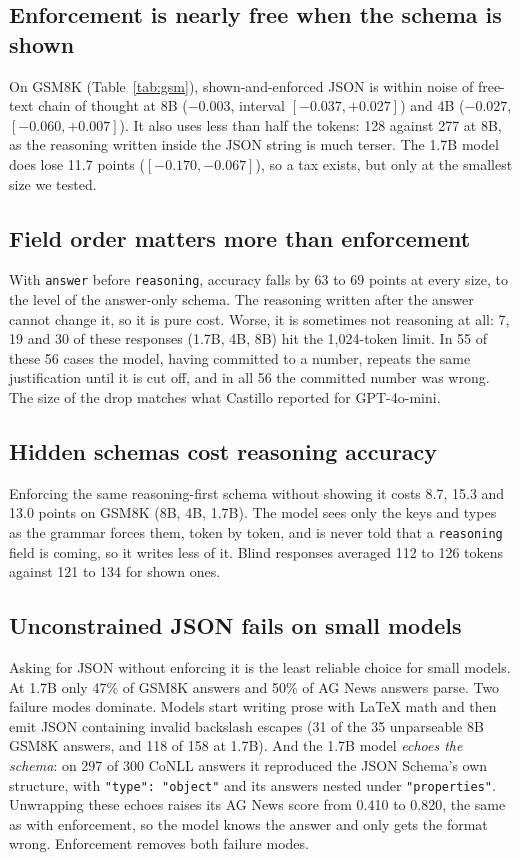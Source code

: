 \documentclass[10pt,twocolumn]{article}
\begin{document}
\subsection{Enforcement is nearly free when the schema is shown}

On GSM8K (Table~\ref{tab:gsm}), shown-and-enforced JSON is within noise of free-text chain of thought at 8B
($-0.003$, interval $[-0.037, +0.027]$) and 4B ($-0.027$, $[-0.060, +0.007]$). It also uses less than half the
tokens: 128 against 277 at 8B, as the reasoning written inside the JSON string is much terser. The 1.7B model does
lose 11.7 points ($[-0.170, -0.067]$), so a tax exists, but only at the smallest size we tested.

\subsection{Field order matters more than enforcement}

With \texttt{answer} before \texttt{reasoning}, accuracy falls by 63 to 69 points at every size, to the level of the
answer-only schema. The reasoning written after the answer cannot change it, so it is pure cost. Worse, it is
sometimes not reasoning at all: 7, 19 and 30 of these responses (1.7B, 4B, 8B) hit the 1,024-token limit. In 55 of
these 56 cases the model, having committed to a number, repeats the same justification until it is cut off, and in all
56 the committed number was wrong. The size of the drop matches what Castillo \cite{castillo} reported for
GPT-4o-mini.

\subsection{Hidden schemas cost reasoning accuracy}

Enforcing the same reasoning-first schema without showing it costs 8.7, 15.3 and 13.0 points on GSM8K (8B, 4B,
1.7B). The model sees only the keys and types as the grammar forces them, token by token, and is never told that a
\texttt{reasoning} field is coming, so it writes less of it. Blind responses averaged 112 to 126 tokens against 121 to
134 for shown ones.

\subsection{Unconstrained JSON fails on small models}

Asking for JSON without enforcing it is the least reliable choice for small models. At 1.7B only 47\% of GSM8K
answers and 50\% of AG News answers parse. Two failure modes dominate. Models start writing prose with LaTeX math
and then emit JSON containing invalid backslash escapes (31 of the 35 unparseable 8B GSM8K answers, and 118 of 158 at 1.7B). And the 1.7B
model \emph{echoes the schema}: on 297 of 300 CoNLL answers it reproduced the JSON Schema's own structure, with
\texttt{"type": "object"} and its answers nested under \texttt{"properties"}. Unwrapping these echoes raises its AG
News score from 0.410 to 0.820, the same as with enforcement, so the model knows the answer and only gets the format
wrong. Enforcement removes both failure modes.
\end{document}
